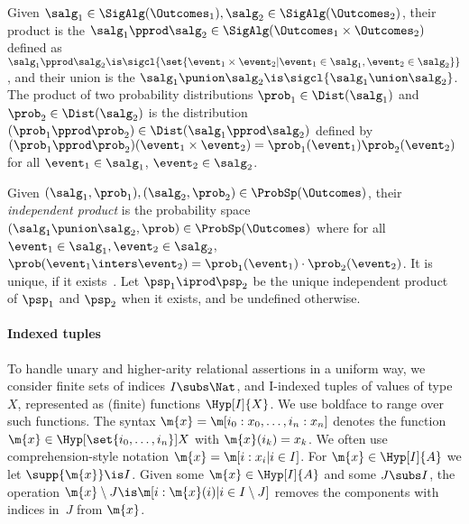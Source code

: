 \begin{definition}
\label{def:prod-union-sp}
  Given $ \salg_1 \in \SigAlg(\Outcomes_1),\salg_2 \in \SigAlg(\Outcomes_2) $,
  their product is the \salgebra{}
  $ \salg_1 \pprod \salg_2 \in \SigAlg(\Outcomes_1 \times \Outcomes_2) $
  defined as
  $ \salg_1 \pprod \salg_2 \is \sigcl{\set{\event_1 \times \event_2 | \event_1 \in \salg_1, \event_2 \in \salg_2}} $,
  and their union is the \salgebra{}
  $ \salg_1 \punion \salg_2 \is \sigcl{\salg_1 \union \salg_2} $.
The product of two probability distributions
  $ \prob_1 \in \Dist(\salg_1) $ and
  $ \prob_2 \in \Dist(\salg_2) $ is
  the distribution
  $ (\prob_1 \pprod \prob_2) \in \Dist(\salg_1 \pprod \salg_2) $
  defined by
  $ (\prob_1 \pprod \prob_2)(\event_1 \times \event_2) = \prob_1(\event_1)\prob_2(\event_2) $
  for all $\event_1 \in \salg_1$, $\event_2 \in \salg_2$.
\end{definition}

\begin{definition}
\label{def:indep-comb}
  Given $ (\salg_1, \prob_1),(\salg_2, \prob_2) \in \ProbSp(\Outcomes) $,
  their \emph{independent product} is
  the probability space
  $(\salg_1 \punion \salg_2, \prob) \in \ProbSp(\Outcomes)$
  where for all~$ \event_1 \in \salg_1, \event_2 \in \salg_2 $,
  $
    \prob(\event_1 \inters \event_2) = \prob_1(\event_1) \cdot \prob_2(\event_2)
  $. It is unique, if it exists~\cite[Lemma 2.3]{lilac}. Let $ \psp_1 \iprod \psp_2 $ be the unique independent product
  of $\psp_1$ and $\psp_2$ when it exists, and be undefined otherwise.
\end{definition}





\paragraph{Indexed tuples}
To handle unary and higher-arity relational assertions in a uniform way,
we consider finite sets of indices $I \subs \Nat$,
and \pre I-indexed tuples of values of type~$X$,
represented as (finite) functions $\Hyp[I]{X}$.
We use boldface to range over such functions.
The syntax $ \m{x} = \m[i_0: x_0,\dots,i_n: x_n] $ denotes the function
$ \m{x} \in \Hyp[\set{i_0,\dots,i_n}]{X} $ with $\m{x}(i_k) = x_k$.
We often use comprehension-style notation \eg $\m{x} = \m[i: x_i | i\in I]$.
For $\m{x} \in \Hyp[I]{A}$ we let $\supp{\m{x}} \is I$.
Given some $ \m{x} \in \Hyp[I]{A} $ and some $J \subs I$,
the operation $ \m{x} \setminus J \is \m[i: \m{x}(i) | i \in I \setminus J] $
removes the components with indices in~$J$ from $\m{x}$.

